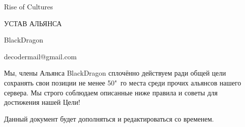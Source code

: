 \documentclass[utf8, 14pt]{roc-class}
\begin{document}
    
    {
        \fancyhead{}
        \fancyfoot{}
        \fancyhead{}
    }
    
    \thispagestyle{firststyle}
    
    \vspace*{\fill}
    \begin{center}
        \Huge
        
        Rise of Cultures
        
        \bigskip
        
        УСТАВ АЛЬЯНСА
        
        BlackDragon
    \end{center}
    \vspace*{\fill}
    \begin{center}
        decodermail@gmail.com
    \end{center}

    \newpage
    
    {
        \hypersetup{linkcolor=black}
        \tableofcontents
    }
    
    \newpage
    
    Мы, члены Альянса BlackDragon сплочённо действуем ради общей цели сохранять свои позиции не менее 50"~го места среди прочих альянсов нашего сервера.
    Мы строго соблюдаем описанные ниже правила и советы для достижения нашей Цели!
    
    \bigskip
    
    Данный документ будет дополняться и редактироваться со временем.
    
    
    
    
    
    
    
\end{document}

